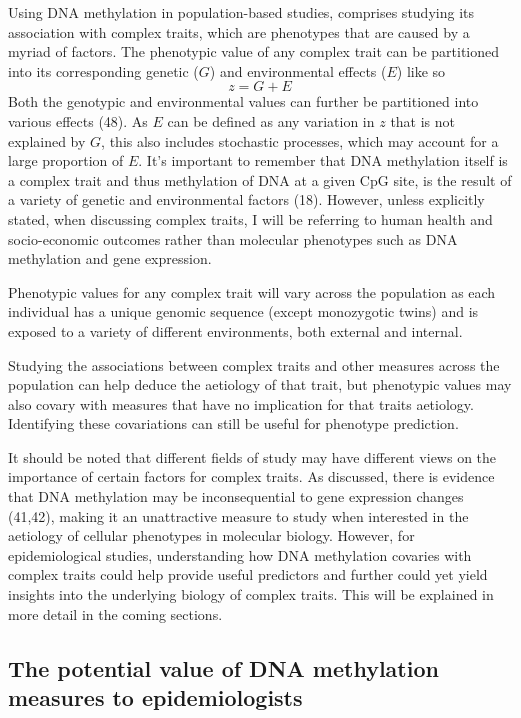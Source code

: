 \documentclass[11pt,oneside]{bristolthesis}
\begin{document}
Using DNA methylation in population-based studies, comprises studying its association with complex traits, which are phenotypes that are caused by a myriad of factors. The phenotypic value of any complex trait can be partitioned into its corresponding genetic (\(G\)) and environmental effects (\(E\)) like so
\begin{equation}
    z = G + E
    \label{eq:phenotypic-values}
\end{equation}
Both the genotypic and environmental values can further be partitioned into various effects (48). As \(E\) can be defined as any variation in \(z\) that is not explained by \(G\), this also includes stochastic processes, which may account for a large proportion of \(E\). It's important to remember that DNA methylation itself is a complex trait and thus methylation of DNA at a given CpG site, is the result of a variety of genetic and environmental factors (18). However, unless explicitly stated, when discussing complex traits, I will be referring to human health and socio-economic outcomes rather than molecular phenotypes such as DNA methylation and gene expression.

Phenotypic values for any complex trait will vary across the population as each individual has a unique genomic sequence (except monozygotic twins) and is exposed to a variety of different environments, both external and internal.

Studying the associations between complex traits and other measures across the population can help deduce the aetiology of that trait, but phenotypic values may also covary with measures that have no implication for that traits aetiology. Identifying these covariations can still be useful for phenotype prediction.

It should be noted that different fields of study may have different views on the importance of certain factors for complex traits. As discussed, there is evidence that DNA methylation may be inconsequential to gene expression changes (41,42), making it an unattractive measure to study when interested in the aetiology of cellular phenotypes in molecular biology. However, for epidemiological studies, understanding how DNA methylation covaries with complex traits could help provide useful predictors and further could yet yield insights into the underlying biology of complex traits. This will be explained in more detail in the coming sections.

\hypertarget{appeal-of-dnam}{%
\subsection{The potential value of DNA methylation measures to epidemiologists}\label{appeal-of-dnam}}
\end{document}
